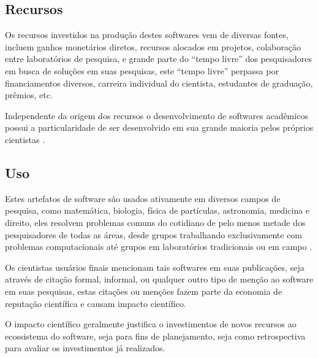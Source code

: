 \subsection{Recursos}

Os recursos investidos na produção destes softwares vem de diversas fontes,
incluem ganhos monetários diretos, recursos alocados em projetos, colaboração
entre laboratórios de pesquisa, e grande parte do ``tempo livre'' dos
pesquisadores em busca de soluções em suas pesquisas, este ``tempo livre''
perpassa por financiamentos diversos, carreira individual do cientista,
estudantes de graduação, prêmios, etc.

Independente da origem dos recursos o desenvolvimento de softwares acadêmicos
possui a particularidade de ser desenvolvido em sua grande maioria pelos
próprios cientistas \cite{segal2008developing, hettrick_2014_14809,
momcheva2015software}.

%

\subsection{Uso}


Estes artefatos de software são usados ativamente em diversos campos de pesquisa, como
matemática, biologia, física de partículas, astronomia, medicina e direito,
eles resolvem problemas comuns do cotidiano de pelo menos metade dos
pesquisadores de todas as áreas, desde grupos trabalhando exclusivamente com
problemas computacionais até grupos em laboratórios tradicionais ou em campo
\cite{wilson2014best}.

Os cientistas usuários finais mencionam tais softwares em suas publicações,
seja através de citação formal, informal, ou qualquer outro tipo de menção ao
software em suas pesquisas, estas citações ou menções fazem parte da economia
de reputação científica e causam impacto científico.

O impacto científico geralmente justifica o investimentos de novos recursos ao
ecossistema do software, seja para fins de planejamento, seja como
retrospectiva para avaliar os investimentos já realizados.


